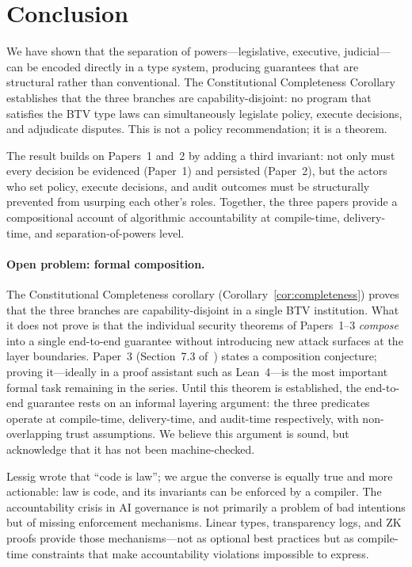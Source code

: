 
\section{Conclusion}
\label{sec:conclusion}

We have shown that the separation of powers---legislative, executive,
judicial---can be encoded directly in a type system, producing
guarantees that are structural rather than conventional. The
Constitutional Completeness Corollary establishes that the three
branches are capability-disjoint: no program that satisfies the BTV
type laws can simultaneously legislate policy, execute decisions, and
adjudicate disputes. This is not a policy recommendation; it is a
theorem.

The result builds on Papers~1 and~2 by adding a third invariant: not
only must every decision be evidenced (Paper~1) and persisted
(Paper~2), but the actors who set policy, execute decisions, and audit
outcomes must be structurally prevented from usurping each other's
roles. Together, the three papers provide a compositional account of
algorithmic accountability at compile-time, delivery-time, and
separation-of-powers level.

\paragraph{Open problem: formal composition.}
The Constitutional Completeness corollary
(Corollary~\ref{cor:completeness}) proves that the three branches
are capability-disjoint in a single BTV institution. What it does
not prove is that the individual security theorems of Papers~1--3
\emph{compose} into a single end-to-end guarantee without
introducing new attack surfaces at the layer boundaries. Paper~3
(Section~7.3 of~\cite{btv-ar2026}) states a composition conjecture;
proving it---ideally in a proof assistant such as Lean~4---is the
most important formal task remaining in the series. Until this
theorem is established, the end-to-end guarantee rests on an
informal layering argument: the three predicates operate at
compile-time, delivery-time, and audit-time respectively, with
non-overlapping trust assumptions. We believe this argument is
sound, but acknowledge that it has not been machine-checked.

Lessig wrote that ``code is law''; we argue the converse is equally
true and more actionable: law is code, and its invariants can be
enforced by a compiler. The accountability crisis in AI governance is
not primarily a problem of bad intentions but of missing enforcement
mechanisms. Linear types, transparency logs, and ZK proofs provide
those mechanisms---not as optional best practices but as compile-time
constraints that make accountability violations impossible to express.
